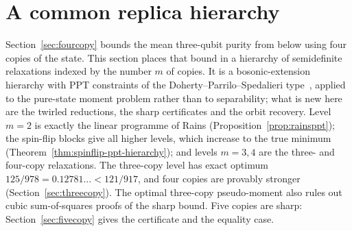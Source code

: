 \section{A common replica hierarchy}\label{sec:hierarchy}

Section~\ref{sec:fourcopy} bounds the mean three-qubit purity from below using four copies of the state. This section places
that bound in a hierarchy of semidefinite relaxations indexed by the number $m$ of copies. It is a bosonic-extension
hierarchy with PPT constraints of the Doherty--Parrilo--Spedalieri type~\cite{DPS}, applied to the pure-state moment problem
rather than to separability; what is new here are the twirled reductions, the sharp certificates and the orbit recovery. Level $m=2$ is exactly the linear
programme of Rains (Proposition~\ref{prop:rainsppt}); the spin-flip blocks give all higher levels, which increase to the true
minimum (Theorem~\ref{thm:spinflip-ppt-hierarchy}); and levels $m=3,4$ are the three- and four-copy relaxations. The three-copy level
has exact optimum $125/978=0.12781\ldots<121/917$, and four copies are provably
stronger (Section~\ref{sec:threecopy}). The optimal three-copy pseudo-moment also rules out cubic sum-of-squares proofs
of the sharp bound. Five copies are sharp: Section~\ref{sec:fivecopy} gives the certificate and the equality case.

